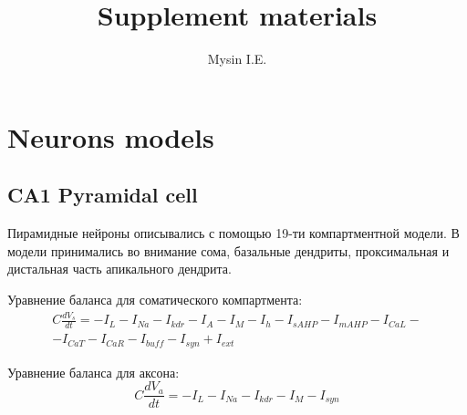 \documentclass[12pt]{article}
\title{Supplement materials}
\author{Mysin I.E.}
\begin{document}
\maketitle

\section{Neurons models}
\subsection{CA1 Pyramidal cell}
Пирамидные нейроны описывались с помощью 19-ти компартментной модели. В модели принимались во внимание сома, базальные дендриты, проксимальная и дистальная часть апикального дендрита. \par
Уравнение баланса для соматического компартмента:
\begin{eqnarray}
C\frac{dV_s}{dt}=-I_L-I_{Na}-I_{kdr}-I_A-I_M-I_h-I_{sAHP}-I_{mAHP}-I_{CaL}- \nonumber \\ -I_{CaT}-I_{CaR}-I_{buff}-I_{syn} + I_{ext}
\end{eqnarray}

Уравнение баланса для аксона:
\begin{equation}
C\frac{dV_a}{dt}=-I_L-I_{Na}-I_{kdr}-I_M-I_{syn}
\end{equation}
\end{document}
